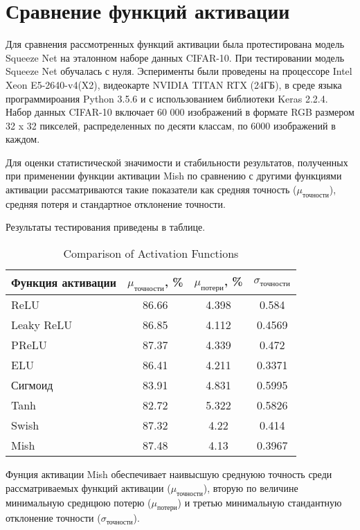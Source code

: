
\chapter{Сравнение функций активации}

Для сравнения рассмотренных функций активации была протестирована модель Squeeze Net на эталонном наборе данных CIFAR-10. При тестировании модель Squeeze Net обучалась с нуля. Эсперименты были проведены на процессоре Intel Xeon E5-2640-v4(X2), видеокарте NVIDIA TITAN RTX (24ГБ), в среде языка программироания Python 3.5.6 и с использованием библиотеки Keras 2.2.4. Набор данных CIFAR-10 включает 60 000 изображений в формате RGB размером 32 x 32 пикселей, распределенных по десяти классам, по 6000 изображений в каждом.

Для оценки статистической значимости и стабильности результатов, полученных при применении функции активации Mish по сравнению с другими функциями активации рассматриваются такие показатели как средняя точность ($\mu_{\text{точности}}$), средняя потеря и стандартное отклонение точности.


Результаты тестирования приведены в таблице.

\begin{table}[ht]
	\centering
	\caption{Comparison of Activation Functions}
	\label{tab:activation-functions}
	\begin{tabularx}{0.8\textwidth}{|X|c|c|c|}
		\hline
		Функция активации & $\mu_{\text{точности}}$, \% & $\mu_{\text{потери}}$, \% & $\sigma_{\text{точности}}$ \\
		\hline
		ReLU    & 86.66 & 4.398 & 0.584 \\ \hline
		Leaky ReLU   & 86.85 & 4.112 & 0.4569  \\ \hline
		PReLU    & 87.37 & 4.339 & 0.472  \\ \hline
		ELU    & 86.41 & 4.211 & 0.3371  \\ \hline
		Сигмоид    & 83.91 & 4.831 & 0.5995  \\ \hline
		Tanh    & 82.72 & 5.322 & 0.5826  \\ \hline
		Swish    & 87.32 & 4.22 & 0.414  \\ \hline
		Mish   & 87.48 & 4.13 & 0.3967 \\ \hline
	\end{tabularx}
\end{table}

Фунция активации Mish обеспечивает наивысшую среднуюю точность среди рассматриваемых функций активации ($\mu_{\text{точности}}$), вторую по величине минимальную среднцюю потерю ($\mu_{\text{потери}}$) и третью минимальную стандантную отклонение точности ($\sigma_{\text{точности}}$).
